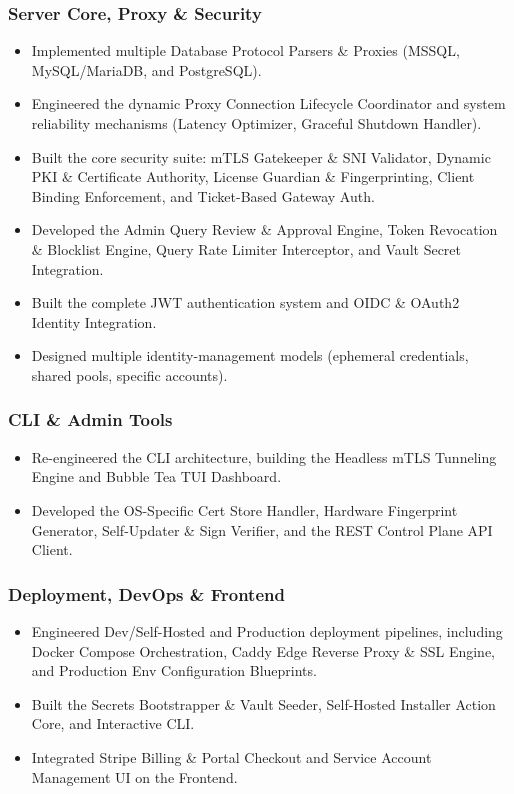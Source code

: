\subsubsection{Server Core, Proxy \& Security}
\begin{itemize}
    \item Implemented multiple Database Protocol Parsers \& Proxies (MSSQL, MySQL/MariaDB, and PostgreSQL).
    \item Engineered the dynamic Proxy Connection Lifecycle Coordinator and system reliability mechanisms (Latency Optimizer, Graceful Shutdown Handler).
    \item Built the core security suite: mTLS Gatekeeper \& SNI Validator, Dynamic PKI \& Certificate Authority, License Guardian \& Fingerprinting, Client Binding Enforcement, and Ticket-Based Gateway Auth.
    \item Developed the Admin Query Review \& Approval Engine, Token Revocation \& Blocklist Engine, Query Rate Limiter Interceptor, and Vault Secret Integration.
    \item Built the complete JWT authentication system and OIDC \& OAuth2 Identity Integration.
    \item Designed multiple identity-management models (ephemeral credentials, shared pools, specific accounts).
\end{itemize}

\subsubsection{CLI \& Admin Tools}
\begin{itemize}
    \item Re-engineered the CLI architecture, building the Headless mTLS Tunneling Engine and Bubble Tea TUI Dashboard.
    \item Developed the OS-Specific Cert Store Handler, Hardware Fingerprint Generator, Self-Updater \& Sign Verifier, and the REST Control Plane API Client.
\end{itemize}

\subsubsection{Deployment, DevOps \& Frontend}
\begin{itemize}
    \item Engineered Dev/Self-Hosted and Production deployment pipelines, including Docker Compose Orchestration, Caddy Edge Reverse Proxy \& SSL Engine, and Production Env Configuration Blueprints.
    \item Built the Secrets Bootstrapper \& Vault Seeder, Self-Hosted Installer Action Core, and Interactive CLI.
    \item Integrated Stripe Billing \& Portal Checkout and Service Account Management UI on the Frontend.
\end{itemize}

